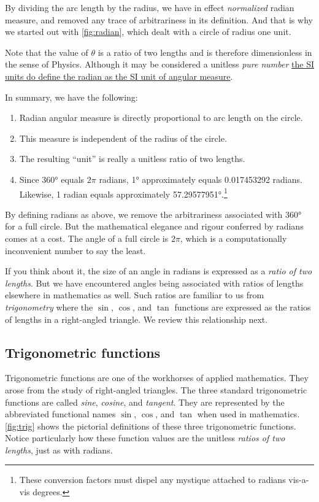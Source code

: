 \documentclass[
  a4paper,
]{article}
\providecommand{\tightlist}{%
  \setlength{\itemsep}{0pt}\setlength{\parskip}{0pt}}
\begin{document}
By dividing the arc length by the radius, we have in effect
\emph{normalized} radian measure, and removed any trace of arbitrariness
in its definition. And that is why we started out with
\cref{fig:radian}, which dealt with a circle of radius one unit.

Note that the value of \(\theta\) is a ratio of two lengths and is
therefore dimensionless in the sense of Physics. Although it may be
considered a unitless \emph{pure number}
\href{https://en.wikipedia.org/wiki/Radian}{the SI units do define the
radian as the SI unit of angular measure}.

In summary, we have the following:

\begin{enumerate}
\tightlist
\item
  Radian angular measure is directly proportional to arc length on the
  circle.
\item
  This measure is independent of the radius of the circle.
\item
  The resulting ``unit'' is really a unitless ratio of two lengths.
\item
  Since 360° equals \(2\pi\) radians, 1° approximately equals
  0.017453292 radians. Likewise, 1 radian equals approximately
  57.29577951°.\footnote{These conversion factors must dispel any
    mystique attached to radians vis-a-vis degrees.}
\end{enumerate}

By defining radians as above, we remove the arbitrariness associated
with 360° for a full circle. But the mathematical elegance and rigour
conferred by radians comes at a cost. The angle of a full circle is
\(2\pi\), which is a computationally inconvenient number to say the
least.

If you think about it, the size of an angle in radians is expressed as a
\emph{ratio of two lengths}. But we have encountered angles being
associated with ratios of lengths elsewhere in mathematics as well. Such
ratios are familiar to us from \emph{trigonometry} where the \(\sin\),
\(\cos\), and \(\tan\) functions are expressed as the ratios of lengths
in a right-angled triangle. We review this relationship next.

\hypertarget{trigonometric-functions}{%
\subsection{Trigonometric functions}\label{trigonometric-functions}}

Trigonometric functions are one of the workhorses of applied
mathematics. They arose from the study of right-angled triangles. The
three standard trigonometric functions are called \emph{sine},
\emph{cosine}, and \emph{tangent}. They are represented by the
abbreviated functional names \(\sin\), \(\cos\), and \(\tan\) when used
in mathematics. \cref{fig:trig} shows the pictorial definitions of these
three trigonometric functions. Notice particularly how these function
values are the unitless \emph{ratios of two lengths}, just as with
radians.
\end{document}
